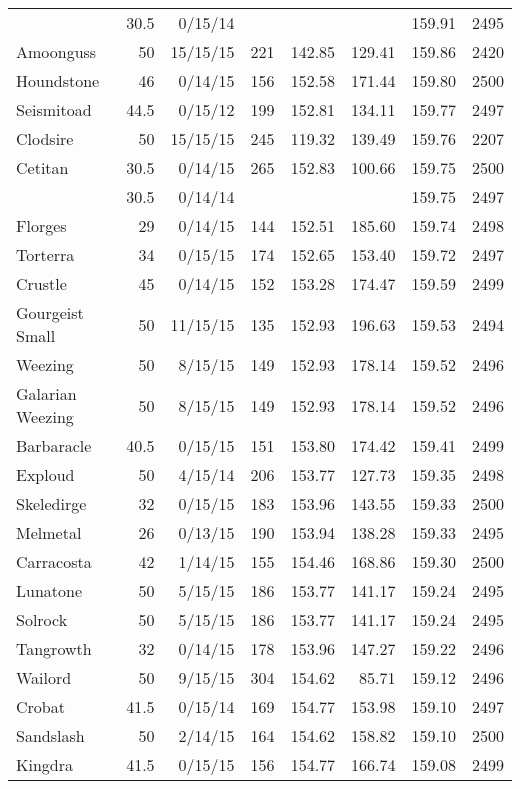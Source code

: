 \begin{longtable}{lrrrrrrr}
 & 30.5 & 0/15/14 & & & & 159.91 & 2495\\
Amoonguss & 50 & 15/15/15 & 221 & 142.85 & 129.41 & 159.86 & 2420\\
Houndstone & 46 & 0/14/15 & 156 & 152.58 & 171.44 & 159.80 & 2500\\
Seismitoad & 44.5 & 0/15/12 & 199 & 152.81 & 134.11 & 159.77 & 2497\\
Clodsire & 50 & 15/15/15 & 245 & 119.32 & 139.49 & 159.76 & 2207\\
Cetitan & 30.5 & 0/14/15 & 265 & 152.83 & 100.66 & 159.75 & 2500\\
 & 30.5 & 0/14/14 & & & & 159.75 & 2497\\
Florges & 29 & 0/14/15 & 144 & 152.51 & 185.60 & 159.74 & 2498\\
Torterra & 34 & 0/15/15 & 174 & 152.65 & 153.40 & 159.72 & 2497\\
Crustle & 45 & 0/14/15 & 152 & 153.28 & 174.47 & 159.59 & 2499\\
Gourgeist Small & 50 & 11/15/15 & 135 & 152.93 & 196.63 & 159.53 & 2494\\
Weezing & 50 & 8/15/15 & 149 & 152.93 & 178.14 & 159.52 & 2496\\
Galarian Weezing & 50 & 8/15/15 & 149 & 152.93 & 178.14 & 159.52 & 2496\\
Barbaracle & 40.5 & 0/15/15 & 151 & 153.80 & 174.42 & 159.41 & 2499\\
Exploud & 50 & 4/15/14 & 206 & 153.77 & 127.73 & 159.35 & 2498\\
Skeledirge & 32 & 0/15/15 & 183 & 153.96 & 143.55 & 159.33 & 2500\\
Melmetal & 26 & 0/13/15 & 190 & 153.94 & 138.28 & 159.33 & 2495\\
Carracosta & 42 & 1/14/15 & 155 & 154.46 & 168.86 & 159.30 & 2500\\
Lunatone & 50 & 5/15/15 & 186 & 153.77 & 141.17 & 159.24 & 2495\\
Solrock & 50 & 5/15/15 & 186 & 153.77 & 141.17 & 159.24 & 2495\\
Tangrowth & 32 & 0/14/15 & 178 & 153.96 & 147.27 & 159.22 & 2496\\
Wailord & 50 & 9/15/15 & 304 & 154.62 & 85.71 & 159.12 & 2496\\
Crobat & 41.5 & 0/15/14 & 169 & 154.77 & 153.98 & 159.10 & 2497\\
Sandslash & 50 & 2/14/15 & 164 & 154.62 & 158.82 & 159.10 & 2500\\
Kingdra & 41.5 & 0/15/15 & 156 & 154.77 & 166.74 & 159.08 & 2499\\

\end{longtable}
